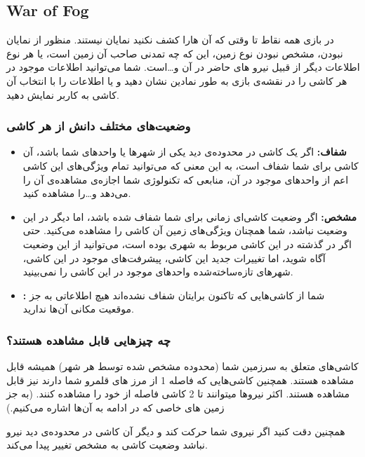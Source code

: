 \documentclass[]{article}
\begin{document}
\subsection*{{\titr War of Fog}} %
در بازی همه نقاط تا وقتی که آن هارا کشف نکنید نمایان نیستند. منظور از نمایان نبودن، مشخص نبودن نوع زمین،  این که چه تمدنی صاحب آن زمین است، یا هر نوع اطلاعات دیگر از قبیل نیرو های حاضر در آن و\dots است. شما می‌توانید اطلاعات موجود در هر کاشی را در نقشه‌ی بازی به طور نمادین نشان دهید و یا اطلاعات را با انتخاب آن کاشی به کاربر نمایش دهید.
\subsubsection*{{\titr وضعیت‌های مختلف دانش از هر کاشی}}
\begin{itemize}
	\item \textbf{شفاف:} 
	اگر یک کاشی در محدوده‌ی دید یکی از شهرها یا واحدهای شما باشد، آن کاشی برای شما شفاف است، به این معنی که می‌توانید تمام ویژگی‌های این کاشی اعم از واحدهای موجود در آن، منابعی که تکنولوژی شما اجازه‌ی مشاهده‌ی آن را می‌دهد و\dots را مشاهده کنید.
	\item \textbf{مشخص:}
	اگر وضعیت کاشی‌ای زمانی برای شما شفاف شده باشد، اما دیگر در این وضعیت نباشد، شما همچنان ویژگی‌های زمین آن کاشی را مشاهده می‌کنید. حتی اگر در گذشته در این کاشی مربوط به شهری بوده است، می‌توانید از این وضعیت آگاه شوید، اما تغییرات جدید این کاشی، پیشرفت‌های موجود در این کاشی، شهرهای تازه‌ساخته‌شده واحدهای موجود در این کاشی را نمی‌بینید.
	\item \textbf{:} شما از کاشی‌هایی که تاکنون برایتان شفاف نشده‌اند هیچ اطلاعاتی به جز موقعیت مکانی آن‌ها ندارید.
\end{itemize}
\subsubsection*{{\titr چه چیز‌هایی قابل مشاهده هستند؟}}
کاشی‌های متعلق به سرزمین شما (محدوده مشخص شده توسط هر شهر) همیشه قابل مشاهده هستند. همچنین کاشی‌هایی که فاصله 1 از مرز های قلمرو شما دارند نیز قابل مشاهده هستند. اکثر نیرو‌ها میتوانند تا 2 کاشی فاصله از خود را مشاهده کنند. (به جز زمین های خاصی که در ادامه به آن‌ها اشاره می‌کنیم.)

همچنین دقت کنید اگر نیروی شما حرکت کند و دیگر آن کاشی در محدوده‌ی دید نیرو نباشد وضعیت کاشی به مشخص تغییر پیدا می‌کند.
\end{document}
